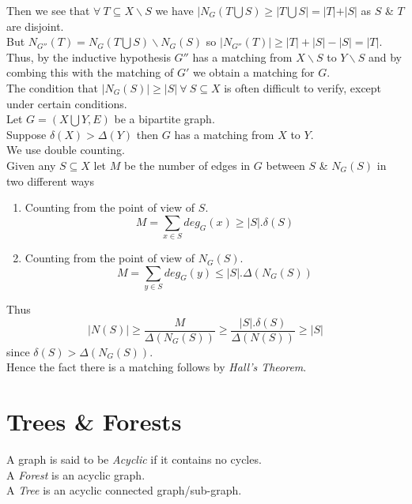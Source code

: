\documentclass[11pt,a4paper]{article}
\begin{document}
Then we see that $\forall\ T\subseteq X\backslash S$ we have $|N_G(T\bigcup S)\geq|T\bigcup S|=|T|+|S|$ as $S$ \& $T$ are disjoint.\\
But $N_{G''}(T)=N_G(T\bigcup S)\backslash N_G(S)$ so $|N_{G''}(T)|\geq |T|+|S|-|S|=|T|$.\\
Thus, by the inductive hypothesis $G''$ has a matching from $X\backslash S$ to $Y\backslash S$ and by combing this with the matching of $G'$ we obtain a matching for $G$.\\

The condition that $|N_G(S)|\geq|S|\ \forall\ S\subseteq X$ is often difficult to verify, except under certain conditions.\\

Let $G=(X\bigcup Y,E)$ be a bipartite graph.\\
Suppose $\delta(X)>\Delta(Y)$ then $G$ has a matching from $X$ to $Y$.\\

We use double counting.\\
Given any $S\subseteq X$ let $M$ be the number of edges in $G$ between $S$ \& $N_G(S)$ in two different ways
\begin{enumerate}[label=\roman*)]
	\item Counting from the point of view of $S$.
	$$M=\sum_{x\in S}deg_G(x)\geq|S|.\delta(S)$$
	\item Counting from the point of view of $N_G(S)$.
	$$M=\sum_{y\in S}deg_G(y)\leq|S|.\Delta(N_G(S))$$
\end{enumerate}
Thus
$$|N(S)|\geq\frac{M}{\Delta(N_G(S))}\geq\frac{|S|.\delta(S)}{\Delta(N(S))}\geq|S|$$
since $\delta(S)>\Delta(N_G(S))$.\\
Hence the fact there is a matching follows by \textit{Hall's Theorem}.\\

\section{Trees \& Forests}

A graph is said to be \textit{Acyclic} if it contains no cycles.\\

A \textit{Forest} is an acyclic graph.\\

A \textit{Tree} is an acyclic connected graph/sub-graph.\\
\end{document}
